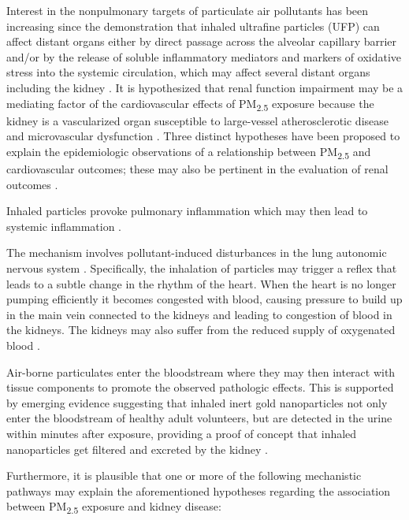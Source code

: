 \documentclass[11pt]{article}
\newcommand{\tsub}{\textsubscript}
\begin{document}
Interest in the nonpulmonary targets of particulate air pollutants has been increasing since the demonstration that inhaled ultrafine particles (UFP) can affect distant organs either by direct passage across the alveolar capillary barrier and/or by the release of soluble inflammatory mediators and markers of oxidative stress into the systemic circulation, which may affect several distant organs including the kidney \citep{nemmar2004possible, oberdorster2005nanotoxicology, peters2006translocation, vermylen2005ambient, nemmar2013recent}. It is hypothesized that renal function impairment may be a mediating factor of the cardiovascular effects of PM\tsub{2.5} exposure because the kidney is a vascularized organ susceptible to large-vessel atherosclerotic disease and microvascular dysfunction \citep{lue2013residential}. Three distinct hypotheses have been proposed to explain the epidemiologic observations of a relationship between PM\tsub{2.5} and cardiovascular outcomes; these may also be pertinent in the evaluation of renal outcomes \citep{bowe2018particulate}.
\begin{enumerate*}[{[1)]}]
    \item Inhaled particles provoke pulmonary inflammation which may then lead to systemic inflammation \citep{chin2014basic}.
    \item The mechanism involves pollutant-induced disturbances in the lung autonomic nervous system \citep{chin2014basic}. Specifically, the inhalation of particles may trigger a reflex that leads to a subtle change in the rhythm of the heart. When the heart is no longer pumping efficiently it becomes congested with blood, causing pressure to build up in the main vein connected to the kidneys and leading to congestion of blood in the kidneys. The kidneys may also suffer from the reduced supply of oxygenated blood \citep{kazory2009anemia}.
    \item Air-borne particulates enter the bloodstream where they may then interact with tissue components to promote the observed pathologic effects. This is supported by emerging evidence suggesting that inhaled inert gold nanoparticles not only enter the bloodstream of healthy adult volunteers, but are detected in the urine within minutes after exposure, providing a proof of concept that inhaled nanoparticles get filtered and excreted by the kidney \citep{chin2014basic, miller2017inhaled}.
\end{enumerate*}
Furthermore, it is plausible that one or more of the following mechanistic pathways may explain the aforementioned hypotheses regarding the association between PM\tsub{2.5} exposure and kidney disease:
\end{document}
